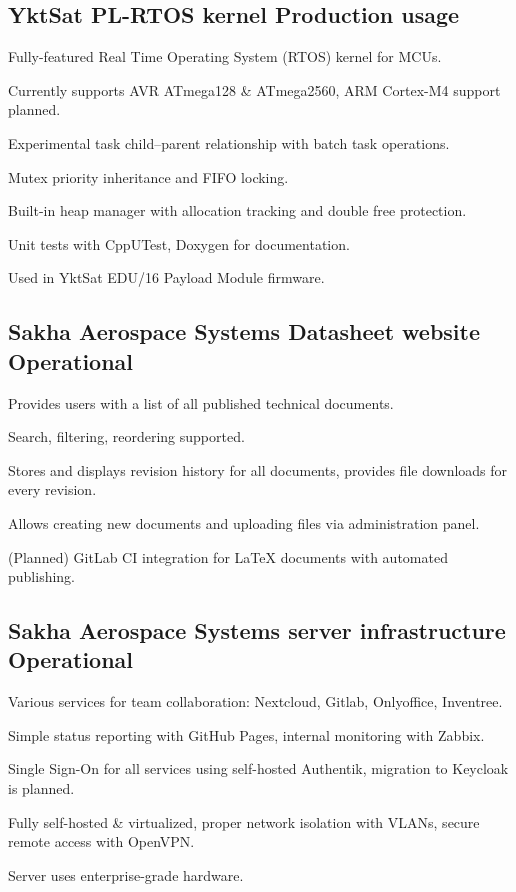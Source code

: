 \documentclass[letter,10pt]{article}
\begin{document}
\subsection{{YktSat PL-RTOS kernel \hfill Production usage}}
\begin{zitemize}
\item Fully-featured Real Time Operating System (RTOS) kernel for MCUs.
\item Currently supports AVR ATmega128 \& ATmega2560, ARM Cortex-M4 support planned.
\item Experimental task child--parent relationship with batch task operations.
\item Mutex priority inheritance and FIFO locking.
\item Built-in heap manager with allocation tracking and double free protection.
\item Unit tests with CppUTest, Doxygen for documentation.
\item Used in YktSat EDU/16 Payload Module firmware.
\end{zitemize}

\subsection{{Sakha Aerospace Systems Datasheet website \hfill Operational}}
\begin{zitemize}
\item Provides users with a list of all published technical documents.
\item Search, filtering, reordering supported.
\item Stores and displays revision history for all documents, provides file downloads for every revision.
\item Allows creating new documents and uploading files via administration panel.
\item (Planned) GitLab CI integration for {\LaTeX} documents with automated publishing.
\end{zitemize}

\subsection{{Sakha Aerospace Systems server infrastructure \hfill Operational}}
\begin{zitemize}
\item Various services for team collaboration: Nextcloud, Gitlab, Onlyoffice, Inventree.
\item Simple status reporting with GitHub Pages, internal monitoring with Zabbix.
\item Single Sign-On for all services using self-hosted Authentik, migration to Keycloak is planned.
\item Fully self-hosted \& virtualized, proper network isolation with VLANs, secure remote access with OpenVPN.
\item Server uses enterprise-grade hardware.
\end{zitemize}
\end{document}
